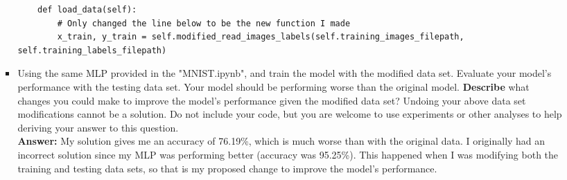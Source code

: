 \documentclass{assignment}
\begin{document}
\begin{problem}
\begin{enumerate}
\begin{enumerate}[label=(\alph*)]
\begin{itemize}
\begin{lstlisting}
    def load_data(self):
        # Only changed the line below to be the new function I made
        x_train, y_train = self.modified_read_images_labels(self.training_images_filepath, self.training_labels_filepath)
                \end{lstlisting} \color{black}
            \item Using the same MLP provided in the "MNIST.ipynb", and train the model with the modified data set. Evaluate your model's performance with the testing data set. Your model should be performing worse than the original model. \textbf{Describe} what changes you could make to improve the model's performance given the modified data set? Undoing your above data set modifications cannot be a solution. Do not include your code, but you are welcome to use experiments or other analyses to help deriving your answer to this question.\\
                \color{blue}\textbf{Answer:} 
                    My solution gives me an accuracy of 76.19\%, which is much worse than with the original data. I originally had an incorrect solution since my MLP was performing better (accuracy was 95.25\%). This happened when I was modifying both the training and testing data sets, so that is my proposed change to improve the model's performance.
                \color{black}
        \end{itemize}


    \end{enumerate}
\end{enumerate}
\end{problem}
\end{document}
